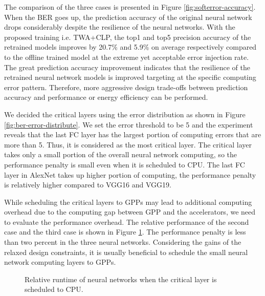 The comparison of the three cases is presented in Figure \ref{fig:softerror-accuracy}.
When the BER goes up, the prediction accuracy of the original neural network drops 
considerably despite the resilience of the neural networks. 
With the proposed training i.e. TWA+CLP, the top1 and top5 precision accuracy 
of the retrained models improves by 20.7\% and 5.9\% on average respectively 
compared to the offline trained model at the extreme yet acceptable error injection rate. 
The great prediction accuracy improvement indicates that the resilience 
of the retrained neural network models is improved targeting at the 
specific computing error pattern. Therefore, more aggressive design trade-offs 
between prediction accuracy and performance or energy efficiency can be performed. 

\begin{figure*}
        \caption{Error distribution across the neural network layers when highest BER is used in AlexNet, VGG16 and VGG19.}
        \label{fig:ber-error-distribute}
	\vspace{-1em}
\end{figure*}

We decided the critical layers using the error distribution as shown in Figure \ref{fig:ber-error-distribute}.
We set the error threshold to be 5 and the experiment reveals that the last FC 
layer has the largest portion of computing errors that are more than 5. Thus, it is considered as 
the most critical layer. The critical layer takes only a small portion of the overall 
neural network computing, so the performance penalty is small even 
when it is scheduled to CPU. The last FC layer in AlexNet takes up higher portion of computing, 
the performance penalty is relatively higher compared to VGG16 and VGG19.

While scheduling the critical layers to GPPs may lead to additional computing overhead
due to the computing gap between GPP and the accelerators, we need to evaluate the
performance overhead. The relative performance of the second case and the third case
is shown in Figure \ref{fig:clp_perf}. The performance penalty is less than two percent
in the three neural networks. Considering the gains of the relaxed design constraints,
it is usually beneficial to schedule the small neural network computing layers to GPPs.
\begin{figure}
        \caption{Relative runtime of neural networks when the critical layer is scheduled to CPU.}
        \label{fig:clp_perf}
		\vspace{-1em}
\end{figure}
